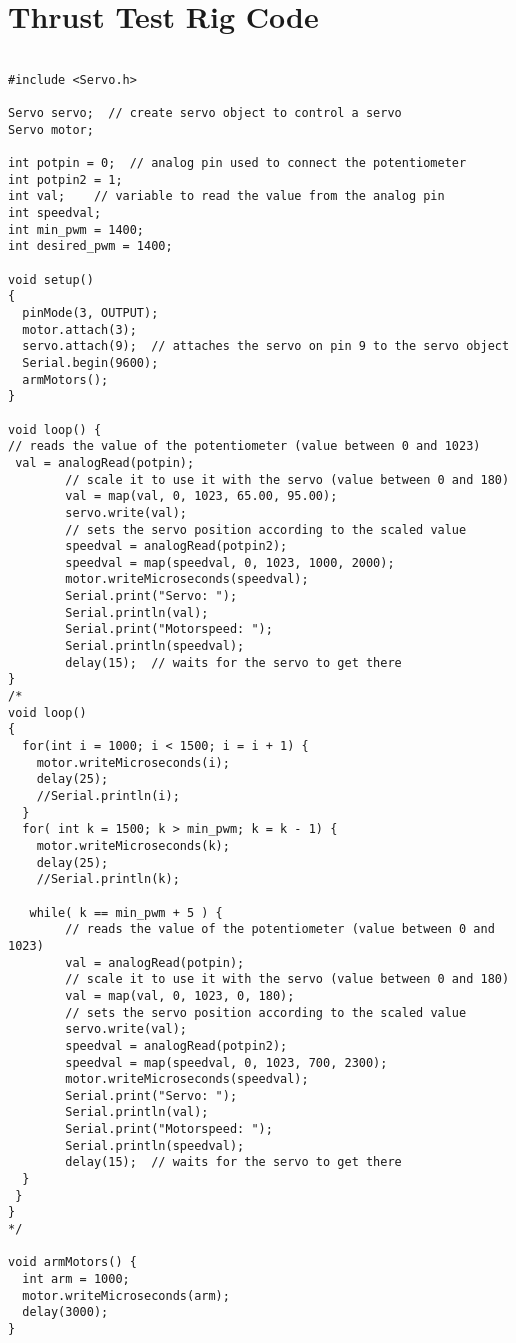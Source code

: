\section{Thrust Test Rig Code}


\begin{lstlisting}

#include <Servo.h>

Servo servo;  // create servo object to control a servo
Servo motor;

int potpin = 0;  // analog pin used to connect the potentiometer
int potpin2 = 1;
int val;    // variable to read the value from the analog pin
int speedval;
int min_pwm = 1400;
int desired_pwm = 1400;

void setup()
{
  pinMode(3, OUTPUT);
  motor.attach(3);
  servo.attach(9);  // attaches the servo on pin 9 to the servo object
  Serial.begin(9600);
  armMotors();
}

void loop() {
// reads the value of the potentiometer (value between 0 and 1023) 
 val = analogRead(potpin);            
        // scale it to use it with the servo (value between 0 and 180) 
        val = map(val, 0, 1023, 65.00, 95.00);    
        servo.write(val);                  
        // sets the servo position according to the scaled value 
        speedval = analogRead(potpin2);
        speedval = map(speedval, 0, 1023, 1000, 2000);
        motor.writeMicroseconds(speedval);
        Serial.print("Servo: "); 
        Serial.println(val);
        Serial.print("Motorspeed: ");
        Serial.println(speedval);
        delay(15);  // waits for the servo to get there   
}
/*
void loop() 
{ 
  for(int i = 1000; i < 1500; i = i + 1) {
    motor.writeMicroseconds(i);
    delay(25);
    //Serial.println(i);
  }  
  for( int k = 1500; k > min_pwm; k = k - 1) {
    motor.writeMicroseconds(k);
    delay(25);
    //Serial.println(k);
    
   while( k == min_pwm + 5 ) {
        // reads the value of the potentiometer (value between 0 and 1023) 
        val = analogRead(potpin);   
        // scale it to use it with the servo (value between 0 and 180) 
        val = map(val, 0, 1023, 0, 180); 
        // sets the servo position according to the scaled value 
        servo.write(val);                  
        speedval = analogRead(potpin2);
        speedval = map(speedval, 0, 1023, 700, 2300);
        motor.writeMicroseconds(speedval);
        Serial.print("Servo: "); 
        Serial.println(val);
        Serial.print("Motorspeed: ");
        Serial.println(speedval);
        delay(15);  // waits for the servo to get there 
  }
 }
} 
*/

void armMotors() {
  int arm = 1000;
  motor.writeMicroseconds(arm);
  delay(3000);
}

\end{lstlisting}